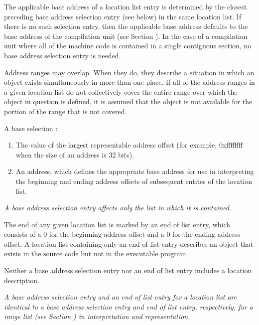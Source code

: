 The applicable base address of a 
location list entry is
determined by the closest preceding base address selection
entry (see below) in the same location list. If there is
no such selection entry, then the applicable base address
defaults to the base address of the compilation unit (see
Section ).  
In the case of a compilation unit where all of
the machine code is contained in a single contiguous section,
no base address selection entry is needed.

Address ranges may overlap. When they do, they describe a
situation in which an object exists simultaneously in more than
one place. If all of the address ranges in a given location
list do not collectively cover the entire range over which the
object in question is defined, it is assumed that the object is
not available for the portion of the range that is not covered.

A base 
selection 
:
\begin{enumerate}[1]
\item The value of the largest representable 
address offset (for example, 0xffffffff when the size of
an address is 32 bits).
\item An address, which defines the 
appropriate base address for use in interpreting the beginning
and ending address offsets of subsequent entries of the location list.
\end{enumerate}


\textit{A base address selection entry 
affects only the list in which it is contained.}

The end of any given location list is marked by an 
end of list entry, which consists of a 0 for the beginning address
offset and a 0 for the ending address offset. A location list
containing only an 
end of list entry describes an object that
exists in the source code but not in the executable program.

Neither a base address selection entry nor an end of list
entry includes a location description.

\textit{A base address selection entry and an end of list
entry for a location list are identical to a base address
selection entry and end of list entry, respectively, for a
range list 
(see Section ) 
in interpretation
and representation.}






